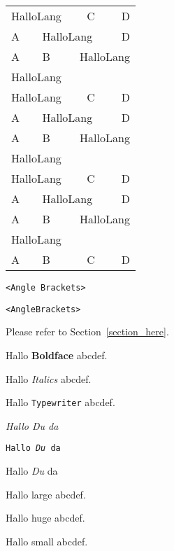 \newcommand{\lcTabularBorder}{2}

\begin{tabular}{llcr}\hline
\multicolumn{2}{l}{HalloLang} & C & D     \\
A & \multicolumn{2}{l}{HalloLang} & D     \\
A & B & \multicolumn{2}{l}{HalloLang}     \\
\multicolumn{4}{l}{HalloLang}             \\
%
\multicolumn{2}{l}{HalloLang} & C & D     \\\hline
A & \multicolumn{2}{l}{HalloLang} & D     \\\hline
A & B & \multicolumn{2}{l}{HalloLang}     \\\hline
\multicolumn{4}{l}{HalloLang}             \\\hline
%
\multicolumn{2}{l}{HalloLang} & C & D     \\\hline\hline
A & \multicolumn{2}{l}{HalloLang} & D     \\\hline\hline
A & B & \multicolumn{2}{l}{HalloLang}     \\\hline\hline
\multicolumn{4}{l}{HalloLang}             \\\hline\hline
%
A & B & C & D                             \\\hline\hline
\end{tabular}

\begin{verbatim}
<Angle Brackets>
\end{verbatim}

\begin{alltt}
<Angle Brackets>
\end{alltt}

\label{section_here}

Please refer to Section~\ref{section_here}.

Hallo {\bf Boldface} abcdef.

Hallo {\it Italics} abcdef.

Hallo {\tt Typewriter} abcdef.

{\it Hallo {\em Du} da}

{\tt Hallo {\em Du} da}

{\sc Hallo {\em Du} da}

Hallo {\large large} abcdef.

Hallo {\huge huge} abcdef.

Hallo {\small small} abcdef.

\def\llca{Hallo}

\def\llcaa{NEIN}

